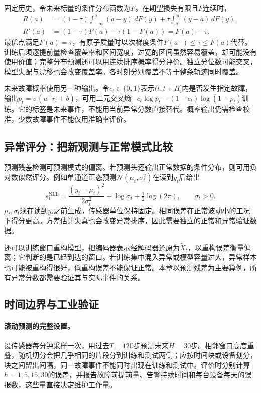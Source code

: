 固定历史，令未来标量的条件分布函数为$F$。在期望损失有限且$F$连续时，
\begin{align}
 R(a)&=(1-\tau)\int_{-\infty}^a(a-y)\,dF(y)+\tau\int_a^\infty(y-a)\,dF(y),\\
 R'(a)&=(1-\tau)F(a)-\tau(1-F(a))=F(a)-\tau.
\end{align}
最优点满足$F(a)=\tau$，有原子质量时以次梯度条件$F(a^-)\leq\tau\leq F(a)$代替。训练后须逐提前量检查覆盖率和区间宽度，过宽的区间虽然容易覆盖，却可能没有使用价值；完整分布预测还可以用连续排序概率得分评价。独立分位数可能交叉，模型失配与漂移也会改变覆盖率。各时刻分别覆盖不等于整条轨迹同时覆盖。

未来故障概率使用另一种输出。令$c_t\in\{0,1\}$表示$(t,t+H]$内是否发生指定故障，输出$p_t=\sigma(w^{\mathsf T}r_t+b)$，可用二元交叉熵$-c_t\log p_t-(1-c_t)\log(1-p_t)$训练。它的标签是未来事件，不能用当前异常分数直接替代。概率输出仍需检查校准，少数故障事件不能仅用准确率评价。

\subsection{异常评分：把新观测与正常模式比较}
\label{sec:sequence-anomaly-score}
预测残差检测可预测模式的偏离。若预测头还输出正常数据的条件分布，则可用负对数似然评分。例如单通道正态预测$\mathcal N(\mu_t,\sigma_t^2)$在读到$y_t$后给出
\begin{equation}
 s_t^{\mathrm{NLL}}=\frac{(y_t-\mu_t)^2}{2\sigma_t^2}+\log\sigma_t+\tfrac12\log(2\pi),\qquad\sigma_t>0.
\end{equation}
$\mu_t,\sigma_t$须在读到$y_t$之前生成，传感器单位保持固定。相同误差在正常波动小的工况下得分更高。方差估计失真也会改变异常排序，因此需要独立的正常和异常验证数据。

还可以训练窗口重构模型，把编码器表示经解码器还原为$\tilde X_t$，以重构误差衡量偏离；它判断的是已经到达的窗口。若训练集中混入异常或模型容量过大，异常样本也可能被重构得很好，低重构误差不能保证正常。本章以预测残差为主要算例，所有异常分数都需要验证其与实际事件的关系。

\subsection{时间边界与工业验证}
\label{sec:sequence-validation}
\paragraph{滚动预测的完整设置。}
设传感器每分钟采样一次，用过去$T=120$步预测未来$H=30$步。相邻窗口高度重叠，随机切分会把几乎相同的片段分到训练和测试两侧；应按时间块或设备划分，块之间留出间隔，同一故障事件不能同时出现在训练和测试中。评价时分别计算$h=1,5,15,30$的误差，并报告故障前提前量、告警持续时间和每台设备每天的误报数，这些量直接决定维护工作量。

